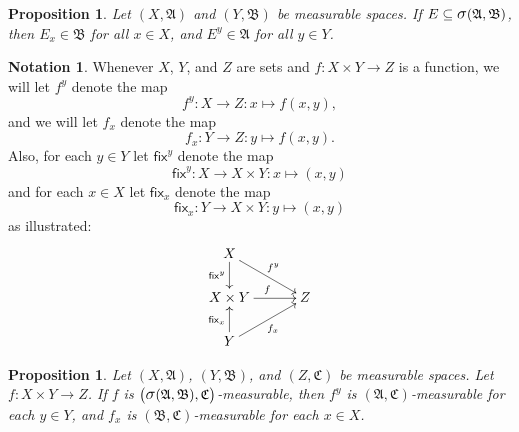 \documentclass[
twoside=true,
paper=letter,
fontsize=11pt,
pagesize=auto,
leqno,
openany,
headsepline,
overfullrule,
]{scrbook}
\theoremstyle{plain}
\theoremstyle{plain}
\newtheorem{prop}[thm]{Proposition}
\theoremstyle{definition}
\newtheorem{notn}[thm]{Notation}
\theoremstyle{bfnoteitalic}
\theoremstyle{bfnoteroman}
\newcommand{\sigalg}[1]{\mathfrak{#1}}
\newcommand{\sfop}[1]{\mathsf{#1}}
\newcommand{\sagb}{\mathop{\hbox{\large{$\sigma$}}}\nolimits}
\newcommand{\sigmaalgebra}{\sigalg{A}}
\newcommand{\sigmaalgebraii}{\sigalg{B}}
\newcommand{\sigmaalgebraiii}{\sigalg{C}}
\newcommand{\productsig}[2]{\sagb(#1,#2)}
\newcommand{\function}{f}
\newcommand{\measurespace}{X}
\newcommand{\measurespaceii}{Y}
\newcommand{\measurespaceiii}{Z}
\newcommand{\mspaceelt}{x}
\newcommand{\mspaceeltii}{y}
\newcommand{\setv}{E}
\newcommand{\fixinthefirst}[1]{\sfop{fix}_{#1}}
\newcommand{\fixinthesecond}[1]{\sfop{fix}^{#1}}
\begin{document}
 
 
\begin{prop}\label{measurable_sections} 
Let 
$(\measurespace,\sigmaalgebra)$ and
$(\measurespaceii,\sigmaalgebraii)$
be measurable spaces. 
If 
$\setv\subseteq\productsig{\sigmaalgebra}{\sigmaalgebraii}$,
then
$\setv_\mspaceelt\in\sigmaalgebraii$ for all 
$\mspaceelt\in\measurespace$, and
$\setv^\mspaceeltii\in\sigmaalgebra$ for all
$\mspaceeltii\in\measurespaceii$.
\end{prop}
 
 
 
\begin{notn}
Whenever $\measurespace$, $\measurespaceii$, and 
$\measurespaceiii$ are sets and 
$\function
:\measurespace\times\measurespaceii\to\measurespaceiii$ is a function, we will let 
$\function^\mspaceeltii$ denote the map
\[
\function^\mspaceeltii
:\measurespace\to\measurespaceiii: 
\mspaceelt \mapsto \function(\mspaceelt,\mspaceeltii),
\]
and we will let $\function_\mspaceelt$ denote the map
\[
\function_\mspaceelt
:\measurespaceii\to\measurespaceiii: 
\mspaceeltii \mapsto \function(\mspaceelt,\mspaceeltii).
\]
Also, for each $\mspaceeltii\in\measurespaceii$ let
$\fixinthesecond{\mspaceeltii}$ denote the map
\[
\fixinthesecond{\mspaceeltii}
:\measurespace\to\measurespace\times\measurespaceii
:\mspaceelt\mapsto (\mspaceelt,\mspaceeltii)
\]
and for each $\mspaceelt\in\measurespace$ let
$\fixinthefirst{\mspaceelt}$ denote the map
\[
\fixinthefirst{\mspaceelt}
:\measurespaceii\to\measurespace\times\measurespaceii
:\mspaceeltii\mapsto (\mspaceelt,\mspaceeltii)
\]
as illustrated:
\[
\xymatrix@R=18pt@C=30pt{ 
\measurespace \ar[d]_-{\fixinthesecond{\mspaceeltii}}
\ar[dr]^{\function^\mspaceeltii}
\\
\measurespace\times \measurespaceii
\ar[r]^{\function} & \measurespaceiii
\\
\measurespaceii
\ar[ur]_{\function_\mspaceelt}
\ar[u]^{\fixinthefirst{\mspaceelt}} & \\
}
\]
\end{notn}
 
 
 \begin{prop}\label{measurable_out_of_product}
Let 
$(\measurespace,\sigmaalgebra)$,
$(\measurespaceii,\sigmaalgebraii)$, and
$(\measurespaceiii,\sigmaalgebraiii)$
be measurable spaces. 
Let 
$\function
:\measurespace\times\measurespaceii\to\measurespaceiii$.
If $\function$ is 
$\bigl(
\productsig{\sigmaalgebra}{\sigmaalgebraii},
\sigmaalgebraiii
\bigr)$\hyp{}measurable, then
$\function^\mspaceeltii$ is 
$(\sigmaalgebra,\sigmaalgebraiii)$\hyp{}measurable for each 
$\mspaceeltii\in\measurespaceii$, and
$\function_\mspaceelt$ is
$(\sigmaalgebraii,\sigmaalgebraiii)$\hyp{}measurable for each 
$\mspaceelt\in\measurespace$.
\end{prop}
 
\end{document}
